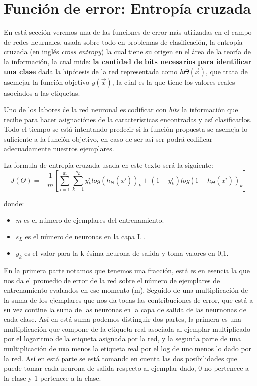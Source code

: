 \section{Función de error: Entropía cruzada}
En está sección veremos una de las funciones de error más utilizadas en el campo de redes neurnales, usada sobre todo en problemas de clasificación, la entropía cruzada (en inglés \emph{cross entropy}) la cual tiene su origen en el área de la teoría de la información, la cual mide: \textbf{la cantidad de bits necesarios para identificar una clase} dada la hipótesis de la red representada como $h\Theta (\vec{x}) $, que trata de asemejar la función objetivo $y(\vec{x})$, la cúal es la que tiene los valores reales asociados a las etiquetas.

Uno de los labores de la red neuronal es codificar con \emph{bits} la información que recibe para hacer asignaciónes de la características encontradas y así clasificarlos. Todo el tiempo se está intentando predecir si la función propuesta se asemeja lo suficiente a la función objetivo, en caso de ser así ser podrá codificar adecuadamente nuestros ejemplares.

La formula de entropía cruzada usada en este texto será la siguiente:
 \begin{equation}
  J (\Theta) = -\dfrac{1}{m}\left[\sum_{i=1}^{m}\sum_{k=1}^{s_{L}}y_{k}^{i} log( h_{\Theta}(x^i))_{k}+(1-y_{k}^{i})log(1- h_{\Theta}(x^i))_{k}  \right]  
  \label{entropiaCruzada}
 \end{equation}

 donde:
 \begin{itemize}
  \item \emph{m} es el número de ejemplares del entrenamiento.
  \item \emph{$s_{L}$} es el número de neuronas en la capa L .
  \item \emph{$y_{k}$} es el valor para la k-ésima neurona de salida y toma valores en {0,1}.

 \end{itemize}
  
En la primera parte notamos que tenemos una fracción, está es en esencia la que nos da el promedio de error de la red sobre el número de ejemplares de entrenamiento evaluados en ese momento (m). Seguido de una multiplicación de la suma de los ejemplares que nos da todas las contribuciones de error, que está a su vez contine la suma de las neuronas en la capa de salida de las neurnonas de cada clase. Así en está suma podemos distinguir dos partes, la primera es una multiplicación que compone de la etiqueta real asociada al ejemplar multiplicado por el logaritmo de la etiqueta asignada por la red, y la segunda parte de una multiplicación de uno menos la etiqueta real por el log de uno menos lo dado por la red. Así en está parte se está tomando en cuenta las dos posibilidades que puede tomar cada neurona de salida respecto al ejemplar dado, $0$ no pertenece a la clase y $1$ pertenece a la clase. 

